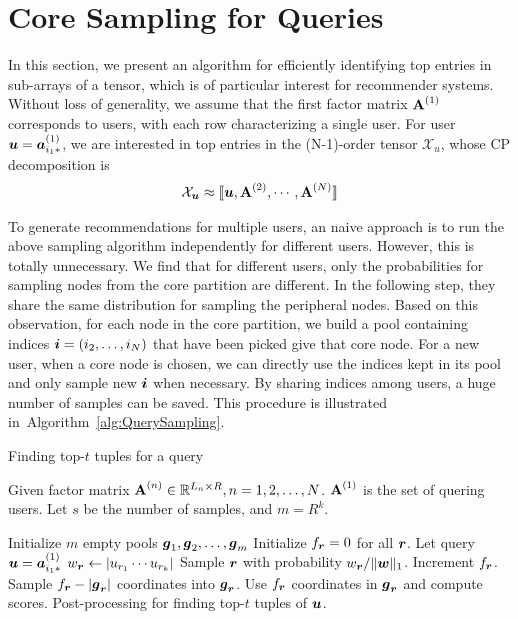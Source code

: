 \documentclass[letterpaper]{article}
\newcommand{\T}[1]{\mathcal{#1}}
\newcommand{\KT}[1]{\llbracket #1 \rrbracket}
\newcommand{\V}[1]{{\boldsymbol{{\MakeLowercase{#1}}}}}
\newcommand{\RowVecA}[1]{\V{a}^{(#1)}_{i_#1*}}
\newcommand{\M}[1]{{\textbf{{\MakeUppercase{#1}}}}}
\newcommand{\FacMat}[2]{\M{#1}^{(#2)}}
\newcommand{\norm}[2]{\|#1\|_{#2}}
\newcommand{\Alg}[1]{Algorithm~\ref{alg:#1}}
\begin{document}
\section{Core Sampling for Queries}

In this section, 
we present an algorithm for efficiently identifying top entries in sub-arrays of a tensor,
which is of particular interest for recommender systems. 
Without loss of generality, 
we assume that the first factor matrix $\FacMat{A}{1}$ corresponds to users, 
with each row characterizing a single user. 
For user $\V{u} = \RowVecA{1}$, 
we are interested in top entries in the (N-1)-order tensor $\T{X}_u$,
whose CP decomposition is
\begin{align}
    \T{X}_{\V{u}} \approx \KT{\V{u},\FacMat{A}{2},\cdots,\FacMat{A}{N}} 
\end{align}

To generate recommendations for multiple users, 
an naive approach is to run the above sampling algorithm independently for different users. 
However, this is totally unnecessary. 
We find that for different users, 
only the probabilities for sampling nodes from the core partition are different. 
In the following step, they share the same distribution for sampling the peripheral nodes. 
Based on this observation, for each node in the core partition, 
we build a pool containing indices $\V{i}=(i_2,\ldots,i_N)$ that have been picked give that core node. 
For a new user, when a core node is chosen, 
we can directly use the indices kept in its pool and only sample new $\V{i}$ when necessary. 
By sharing indices among users, a huge number of samples can be saved. 
This procedure is illustrated in~\Alg{QuerySampling}.

\begin{algorithm}[ht]
    \caption{Finding top-$t$ tuples for a query}
    \label{alg:QuerySampling}
        Given factor matrix $\FacMat{A}{n}\in \mathbb{R}^{L_n\times R}, n = 1,2,\ldots,N$.
        $\FacMat{A}{1}$ is the set of quering users.
        Let $s$ be the number of samples, and $m=R^k$.
    \begin{algorithmic}[1]
    \State Initialize $m$ empty pools $\V{g}_1,\V{g}_2,\ldots,\V{g}_m$
    \State Initialize $f_{\V{r}} = 0$ for all $\V{r}$.
    \State Let query $\V{u}=\RowVecA{1}$
    \ForAll{$\V{r}$}
    \State $w_\V{r} \leftarrow |u_{r_1}\cdots u_{r_k}|$
    \EndFor
    \State Sample $\V{r}$ with probability $w_\V{r}/\norm{\V{W}}{1}$.
    \label{line:Indexes}
    \State  Increment $f_{\V{r}}$.
    \EndFor
    \ForAll {$\V{r}$}
    \If {$f_\V{r} > |\V{g}_\V{r}|$ }
    \State Sample $f_{\V{r}} - |\V{g}_{\V{r}}|$ coordinates into $\V{g}_{\V{r}}$.
    \EndIf
    \State Use $f_{\V{r}}$ coordinates in $\V{g}_{\V{r}}$ and compute scores.
    \EndFor
    \State Post-processing for finding top-$t$ tuples of $\V{u}$.
    \EndFor
    \end{algorithmic}
\end{algorithm}
\end{document}
